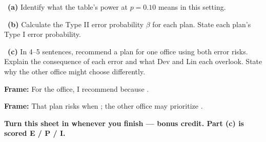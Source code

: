 \documentclass[11pt]{article}
\begin{document}
~\textbf{(a)} Identify what the table's power at $p=0.10$ means in this setting.\par
\workspace{0.8in}

~\textbf{(b)} Calculate the Type II error probability $\beta$ for each plan. State each plan's Type I error probability.\par
\workspace{1.4in}

~\textbf{(c)} In 4--5 sentences, recommend a plan for one office using both error risks. Explain the consequence of each error and what Dev and Lin each overlook. State why the other office might choose differently.\par
\workspace{2.0in}

\begin{sentenceframebox}\raggedright\textbf{Frame:} For the \blank[0.8in] office, I recommend \blank[0.6in] because \blank[2.2in].\end{sentenceframebox}

\begin{sentenceframebox}\raggedright\textbf{Frame:} That plan risks \blank[2.0in] when \blank[1.5in]; the other office may prioritize \blank[1.5in].\end{sentenceframebox}

\textbf{Turn this sheet in whenever you finish --- bonus credit. Part (c) is scored E / P / I.}\par
\end{document}
